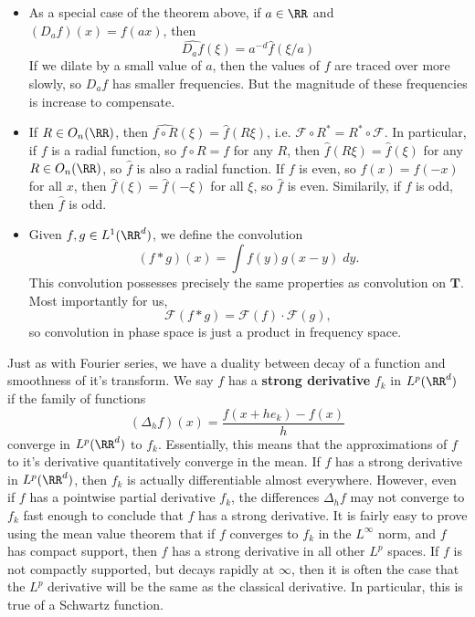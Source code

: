 \begin{itemize}
	\item As a special case of the theorem above, if $a \in \RR$ and $(D_a f)(x) = f(ax)$, then
	\[ \widehat{D_a f}(\xi) = a^{-d} \widehat{f}(\xi/a) \]
	If we dilate by a small value of $a$, then the values of $f$ are traced over more slowly, so $D_a f$ has smaller frequencies. But the magnitude of these frequencies is increase to compensate.

	\item If $R \in O_n(\RR)$, then $\widehat{f \circ R}(\xi) = \widehat{f}(R \xi)$, i.e. $\mathcal{F} \circ R^* = R^* \circ \mathcal{F}$. In particular, if $f$ is a radial function, so $f \circ R = f$ for any $R$, then $\widehat{f}(R \xi) = \widehat{f}(\xi)$ for any $R \in O_n(\RR)$, so $\widehat{f}$ is also a radial function. If $f$ is even, so $f(x) = f(-x)$ for all $x$, then $\widehat{f}(\xi) = \widehat{f}(-\xi)$ for all $\xi$, so $\widehat{f}$ is even. Similarily, if $f$ is odd, then $\widehat{f}$ is odd.

	\item Given $f,g \in L^1(\RR^d)$, we define the convolution
	\[ (f * g)(x) = \int f(y) g(x-y)\; dy. \]
	This convolution possesses precisely the same properties as convolution on $\mathbf{T}$. Most importantly for us,
	\[ \mathcal{F}(f * g) = \mathcal{F}(f) \cdot \mathcal{F}(g), \]
	so convolution in phase space is just a product in frequency space.
\end{itemize}

Just as with Fourier series, we have a duality between decay of a function and smoothness of it's transform. We say $f$ has a {\bf strong derivative} $f_k$ in $L^p(\RR^d)$ if the family of functions
%
\[ (\Delta_h f)(x) = \frac{f(x + h e_k) - f(x)}{h} \]
%
converge in $L^p(\RR^d)$ to $f_k$. Essentially, this means that the approximations of $f$ to it's derivative quantitatively converge in the mean. If $f$ has a strong derivative in $L^p(\RR^d)$, then $f_k$ is actually differentiable almost everywhere. However, even if $f$ has a pointwise partial derivative $f_k$, the differences $\Delta_h f$ may not converge to $f_k$ fast enough to conclude that $f$ has a strong derivative. It is fairly easy to prove using the mean value theorem that if $f$ converges to $f_k$ in the $L^\infty$ norm, and $f$ has compact support, then $f$ has a strong derivative in all other $L^p$ spaces. If $f$ is not compactly supported, but decays rapidly at $\infty$, then it is often the case that the $L^p$ derivative will be the same as the classical derivative. In particular, this is true of a Schwartz function.

